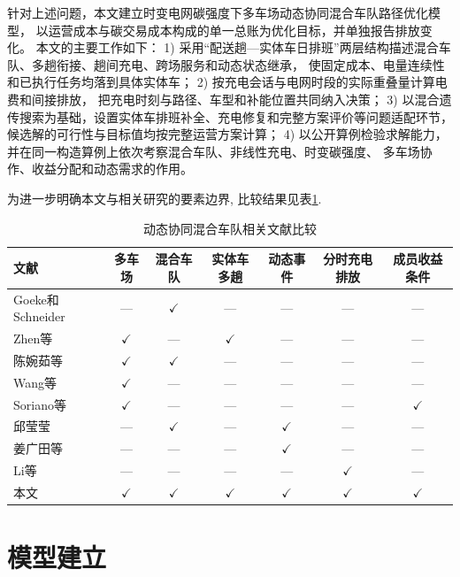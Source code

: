 \documentclass{setp-new}
\newcommand{\setptabsetup}{\fontsize{9pt}{10.5pt}\selectfont\renewcommand{\arraystretch}{0.95}\setlength{\tabcolsep}{2.2pt}\setlength{\aboverulesep}{0.4pt}\setlength{\belowrulesep}{0.4pt}\hbadness=10000}
\begin{document}
针对上述问题，本文建立时变电网碳强度下多车场动态协同混合车队路径优化模型，
以运营成本与碳交易成本构成的单一总账为优化目标，并单独报告排放变化。
本文的主要工作如下：
1) 采用“配送趟—实体车日排班”两层结构描述混合车队、多趟衔接、趟间充电、跨场服务和动态状态继承，
使固定成本、电量连续性和已执行任务均落到具体实体车；
2) 按充电会话与电网时段的实际重叠量计算电费和间接排放，
把充电时刻与路径、车型和补能位置共同纳入决策；
3) 以混合遗传搜索为基础，设置实体车排班补全、充电修复和完整方案评价等问题适配环节，
候选解的可行性与目标值均按完整运营方案计算；
4) 以公开算例检验求解能力，并在同一构造算例上依次考察混合车队、非线性充电、时变碳强度、
多车场协作、收益分配和动态需求的作用。

为进一步明确本文与相关研究的要素边界, 比较结果见表\ref{tab:literature-comparison}.

\begin{table}[H]
\centering
\caption{动态协同混合车队相关文献比较}
\label{tab:literature-comparison}
\setptabsetup
\begin{tabular*}{\linewidth}{@{\extracolsep{\fill}}lcccccc@{}}
\toprule
文献 & 多车场 & 混合车队 & 实体车多趟 & 动态事件 & 分时充电排放 & 成员收益条件\\
\midrule
Goeke和Schneider\cite{ref:27} & --- & $\checkmark$ & --- & --- & --- & ---\\
Zhen等\cite{ref:44} & $\checkmark$ & --- & $\checkmark$ & --- & --- & ---\\
陈婉茹等\cite{ref:23} & $\checkmark$ & $\checkmark$ & --- & --- & --- & ---\\
Wang等\cite{ref:7} & $\checkmark$ & --- & --- & --- & --- & ---\\
Soriano等\cite{ref:8} & $\checkmark$ & --- & --- & --- & --- & $\checkmark$\\
邱莹莹\cite{ref:71} & --- & $\checkmark$ & --- & $\checkmark$ & --- & ---\\
姜广田等\cite{ref:51} & --- & --- & --- & $\checkmark$ & --- & ---\\
Li等\cite{ref:52} & --- & --- & --- & --- & $\checkmark$ & ---\\
本文 & $\checkmark$ & $\checkmark$ & $\checkmark$ & $\checkmark$ & $\checkmark$ & $\checkmark$\\
\bottomrule
\end{tabular*}
\end{table}

\section{模型建立}
\end{document}
